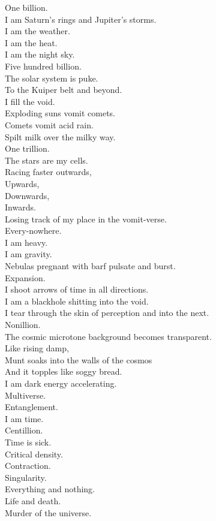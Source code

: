 One billion. \\
I am Saturn's rings and Jupiter's storms. \\
I am the weather. \\
I am the  heat. \\
I am the night sky. \\

Five hundred billion. \\
The solar system is puke. \\
To the Kuiper belt and beyond. \\
I fill the void. \\
Exploding suns vomit comets. \\
Comets vomit acid rain. \\
Spilt milk over the milky way. \\

One trillion. \\
The stars are my cells. \\
Racing faster outwards, \\
Upwards, \\
Downwards, \\
Inwards. \\
Losing track of my place in the vomit-verse. \\
Every-nowhere. \\

I am heavy. \\
I am gravity. \\
Nebulas pregnant with barf pulsate and burst. \\
Expansion. \\
I shoot arrows of time in all directions. \\
I am a blackhole shitting into the void. \\
I tear through the skin of perception and into the next. \\

Nonillion. \\
The cosmic microtone background becomes transparent. \\
Like rising damp, \\
Munt soaks into the walls of the cosmos \\
And it topples like soggy bread. \\
I am dark energy accelerating. \\
Multiverse. \\

Entanglement. \\
I am time. \\
Centillion. \\
Time is sick. \\
Critical density. \\
Contraction. \\
Singularity. \\
Everything and nothing. \\
Life and death. \\
Murder of the universe. \\
